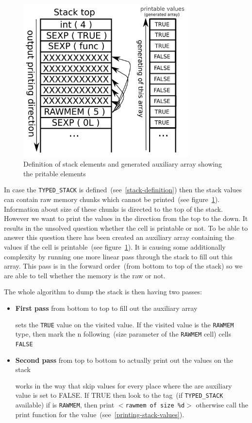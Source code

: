 \documentclass[thesis=M,english]{FITthesis}[2018/10/20]
\newcommand{\code}[1]{\texttt{#1}}
\begin{document}
\begin{figure}[h!]
	\includegraphics[width=90mm]{stack-rawmem.png}
	\caption{Definition of stack elements and generated auxiliary array showing the pritable elements}\label{fig:stack-elements-definition}
\end{figure}

In case the \code{TYPED{\_}STACK} is defined~(see~\ref{stack-definition}) then the stack values can contain raw memory chunks which cannot be printed~(see figure~\ref{fig:stack-elements-definition}). Information about size of these chunks is directed to the top of the stack. However we want to print the values in the direction from the top to the down. It results in the unsolved question whether the cell is printable or not. To be able to answer this question there has been created an auxiliary array containing the values if the cell is printable~(see figure~\ref{fig:stack-elements-definition}). It is causing some additionally complexity by running one more linear pass through the stack to fill out this array. This pass is in the forward order~(from bottom to top of the stack) so we are able to tell whether the memory is the raw or not.

The whole algorithm to dump the stack is then having two passes:

\begin{itemize}
	\item \textbf{First pass} from bottom to top to fill out the auxiliary array

			sets the \code{TRUE} value on the visited value. If the visited value is the \code{RAWMEM} type, then mark the n following~(size parameter of the \code{RAWMEM} cell) cells \code{FALSE}

	\item \textbf{Second pass} from top to bottom to actually print out the values on the stack

			works in the way that skip values for every place where the are auxiliary value is set to FALSE. If TRUE then look to the tag~(if \code{TYPED{\_}STACK} available) if is \code{RAWMEM}, then print \code{$<$rawmem of size \%d$>$} otherwise call the print function for the value~(see~\ref{printing-stack-values}).
\end{itemize}
\end{document}
